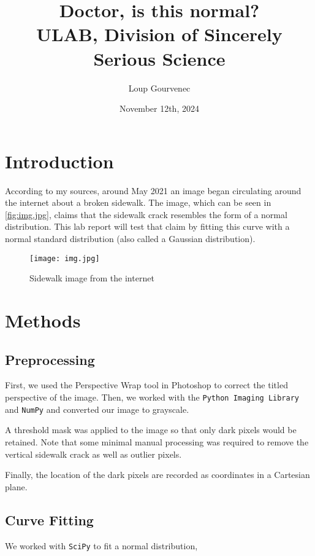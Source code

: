 \documentclass{article}
\title{Doctor, is this normal?
\\ \large ULAB, Division of Sincerely Serious Science }
\author{Loup Gourvenec}
\date{November 12th, 2024}
\begin{document}
\maketitle

\section{Introduction}

According to my sources, around May 2021 an image began circulating around the internet about a broken
sidewalk. The image, which can be seen in \autoref{fig:img.jpg}, claims that the sidewalk crack resembles the form
of a normal distribution. This lab report will test that claim by fitting this curve with a normal standard
distribution (also called a Gaussian distribution).

\begin{figure}[H]
    \centering
    \texttt{[image: img.jpg]}
    \caption{Sidewalk image from the internet}
    \label{fig:img.jpg}
\end{figure}

\section{Methods}

\subsection{Preprocessing}

First, we used the Perspective Wrap tool in Photoshop to correct the titled perspective of the image. Then,
we worked with the \texttt{Python Imaging Library} and \texttt{NumPy} \cite{2020NumPy-Array} and converted our image to grayscale.

A threshold mask was applied to the image so that only dark pixels would be retained. Note that some
minimal manual processing was required to remove the vertical sidewalk crack as well as outlier pixels.

Finally, the location of the dark pixels are recorded as coordinates in a Cartesian plane.

\subsection{Curve Fitting}

We worked with \texttt{SciPy} \cite{2020SciPy-NMeth} to fit a normal distribution,
\end{document}

